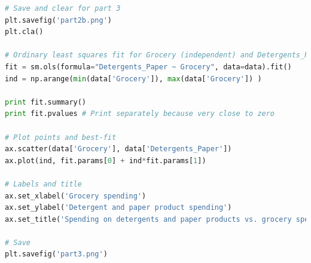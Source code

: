 \documentclass{article}
\begin{document}
\begin{lstlisting}[language=python]
# Save and clear for part 3
plt.savefig('part2b.png')
plt.cla()

# Ordinary least squares fit for Grocery (independent) and Detergents_Paper(dependent)
fit = sm.ols(formula="Detergents_Paper ~ Grocery", data=data).fit()
ind = np.arange(min(data['Grocery']), max(data['Grocery']) )

print fit.summary()
print fit.pvalues # Print separately because very close to zero

# Plot points and best-fit
ax.scatter(data['Grocery'], data['Detergents_Paper'])
ax.plot(ind, fit.params[0] + ind*fit.params[1])

# Labels and title
ax.set_xlabel('Grocery spending')
ax.set_ylabel('Detergent and paper product spending')
ax.set_title('Spending on detergents and paper products vs. grocery spending')

# Save
plt.savefig('part3.png')
	\end{lstlisting}
	
\end{document}
